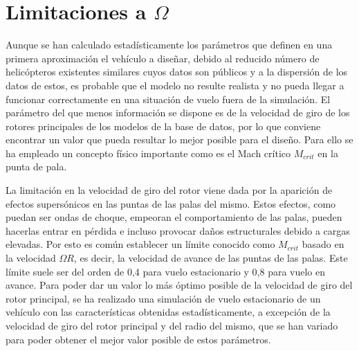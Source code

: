 \section{Limitaciones a $\Omega$}

Aunque se han calculado estadísticamente los parámetros que definen en una primera aproximación el vehículo a diseñar, debido al reducido número de helicópteros existentes similares cuyos datos son públicos y a la dispersión de los datos de estos, es probable que el modelo no resulte realista y no pueda llegar a funcionar correctamente en una situación de vuelo fuera de la simulación. El parámetro del que menos información se dispone es de la velocidad de giro de los rotores principales de los modelos de la base de datos, por lo que conviene encontrar un valor que pueda resultar lo mejor posible para el diseño. Para ello se ha empleado un concepto físico importante como es el Mach crítico $M_{crit}$ en la punta de pala.

La limitación en la velocidad de giro del rotor viene dada por la aparición de efectos supersónicos en las puntas de las palas del mismo. Estos efectos, como puedan ser ondas de choque, empeoran el comportamiento de las palas, pueden hacerlas entrar en pérdida e incluso provocar daños estructurales debido a cargas elevadas.
Por esto es común establecer un límite conocido como $M_{crit}$ basado en la velocidad $\Omega R$, es decir, la velocidad de avance de las puntas de las palas. Este límite suele ser del orden de 0,4 para vuelo estacionario y 0,8 para vuelo en avance. 
Para poder dar un valor lo más óptimo posible de la velocidad de giro del rotor principal, se ha realizado una simulación de vuelo estacionario de un vehículo con las características obtenidas estadísticamente, a excepción de la velocidad de giro del rotor principal y del radio del mismo, que se han variado para poder obtener el mejor valor posible de estos parámetros.


